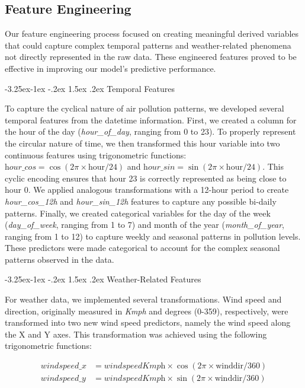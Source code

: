 \documentclass[twoside,11pt]{article}
\makeatletter
\renewcommand\subsubsection{\@startsection{subsubsection}{3}{\z@}%
  {-3.25ex\@plus -1ex \@minus -.2ex}%
  {1.5ex \@plus .2ex}%
  {\normalfont\bfseries\normalsize}}
\makeatother
\begin{document}
\subsection{Feature Engineering}

Our feature engineering process focused on creating meaningful derived variables that could capture complex temporal patterns and weather-related phenomena not directly represented in the raw data. These engineered features proved to be effective in improving our model's predictive performance.

\subsubsection{Temporal Features}

To capture the cyclical nature of air pollution patterns, we developed several temporal features from the datetime information. First, we created a column for the hour of the day (\textit{hour\_of\_day}, ranging from 0 to 23). To properly represent the circular nature of time, we then transformed this hour variable into two continuous features using trigonometric functions: $\textit{hour\_cos} = \cos(2\pi \times \text{hour}/24)$ and $\textit{hour\_sin} = \sin(2\pi \times \text{hour}/24)$. This cyclic encoding ensures that hour 23 is correctly represented as being close to hour 0. We applied analogous transformations with a 12-hour period to create \textit{hour\_cos\_12h} and \textit{hour\_sin\_12h} features to capture any possible bi-daily patterns. Finally, we created categorical variables for the day of the week (\textit{day\_of\_week}, ranging from 1 to 7) and month of the year (\textit{month\_of\_year}, ranging from 1 to 12) to capture weekly and seasonal patterns in pollution levels. These predictors were made categorical to account for the complex seasonal patterns observed in the data.

\subsubsection{Weather-Related Features}

For weather data, we implemented several transformations. Wind speed and direction, originally measured in \textit{Kmph} and degrees (0-359), respectively, were transformed into two new wind speed predictors, namely the wind speed along the X and Y axes. This transformation was achieved using the following trigonometric functions:

\begin{align*}
    \textit{windspeed\_x} &= \textit{windspeedKmph} \times \cos(2\pi \times \text{winddir}/360) \\
    \textit{windspeed\_y} &= \textit{windspeedKmph} \times \sin(2\pi \times \text{winddir}/360)
\end{align*}
\end{document}
